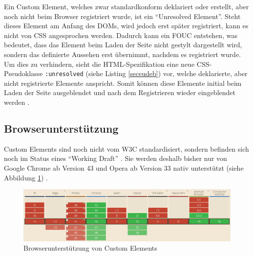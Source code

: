 Ein Custom Element, welches zwar standardkonform deklariert oder erstellt, aber noch nicht beim Browser registriert wurde, ist ein ``Unresolved Element''. Steht dieses Element am Anfang des \ac{DOM}s, wird jedoch erst später registriert, kann es nicht von \ac{CSS} angesprochen werden. Dadurch kann ein \ac{FOUC} entstehen, was bedeutet, dass das Element beim Laden der Seite nicht gestylt dargestellt wird, sondern das definierte Aussehen erst übernimmt, nachdem es registriert wurde. Um dies zu verhindern, sieht die \ac{HTML}-Spezifikation eine neue \ac{CSS}-Pseudoklasse \texttt{:unresolved} (siehe Listing \ref{seceudeb}) vor, welche deklarierte, aber nicht registrierte Elemente anspricht. Somit können diese Elemente initial beim Laden der Seite ausgeblendet und nach dem Registrieren wieder eingeblendet werden \cite{citeulike:13844984}.



\subsection{Browserunterstützung}\label{custom-elements-browserunterstuetzung}

Custom Elements sind noch nicht vom \ac{W3C} standardisiert, sondern befinden sich noch im Status eines ``Working Draft'' \cite{citeulike:13845061}. Sie werden deshalb bisher nur von \mbox{Google} Chrome ab Version 43 und Opera ab Version 33 nativ unterstützt (siehe Abbildung \ref{fig:buce}) \cite{citeulike:13844983}.

\begin{figure}[htbp]
 \centering
 \includegraphics[width=\linewidth]{kapitel2/bilder/2-custom-elements-browserunterstuetzung}
 \caption{Browserunterstützung von Custom Elements}
 \label{fig:buce}
\end{figure}
